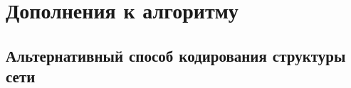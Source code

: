 \FloatBarrier
\chapter{Дополнения к алгоритму}

\FloatBarrier
\section{Альтернативный способ кодирования структуры сети}
